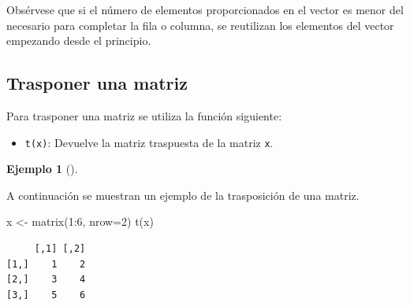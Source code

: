 \documentclass[
  spanish,
  a4paper,
]{scrreport}
\newenvironment{Shaded}{\begin{snugshade}}{\end{snugshade}}
\newcommand{\AttributeTok}[1]{\textcolor[rgb]{0.40,0.45,0.13}{#1}}
\newcommand{\DecValTok}[1]{\textcolor[rgb]{0.68,0.00,0.00}{#1}}
\newcommand{\FunctionTok}[1]{\textcolor[rgb]{0.28,0.35,0.67}{#1}}
\newcommand{\NormalTok}[1]{\textcolor[rgb]{0.00,0.23,0.31}{#1}}
\newcommand{\OtherTok}[1]{\textcolor[rgb]{0.00,0.23,0.31}{#1}}
\newcommand{\SpecialCharTok}[1]{\textcolor[rgb]{0.37,0.37,0.37}{#1}}
\providecommand{\tightlist}{%
  \setlength{\itemsep}{0pt}\setlength{\parskip}{0pt}}
\theoremstyle{definition}
\theoremstyle{definition}
\newtheorem{example}{Ejemplo}[chapter]
\theoremstyle{remark}
\begin{document}
\begin{tcolorbox}[enhanced jigsaw, arc=.35mm, bottomrule=.15mm, bottomtitle=1mm, breakable, colback=white, colbacktitle=quarto-callout-warning-color!10!white, colframe=quarto-callout-warning-color-frame, coltitle=black, left=2mm, leftrule=.75mm, opacityback=0, opacitybacktitle=0.6, rightrule=.15mm, title=\textcolor{quarto-callout-warning-color}{\faExclamationTriangle}\hspace{0.5em}{Advertencia}, titlerule=0mm, toprule=.15mm, toptitle=1mm]

Obsérvese que si el número de elementos proporcionados en el vector es
menor del necesario para completar la fila o columna, se reutilizan los
elementos del vector empezando desde el principio.

\end{tcolorbox}

\subsection{Trasponer una matriz}\label{trasponer-una-matriz}

Para trasponer una matriz se utiliza la función siguiente:

\begin{itemize}
\tightlist
\item
  \texttt{t(x)}: Devuelve la matriz traspuesta de la matriz \texttt{x}.
\end{itemize}

\begin{example}[]\protect\hypertarget{exm-trasposicion-matriz}{}\label{exm-trasposicion-matriz}

A continuación se muestran un ejemplo de la trasposición de una matriz.

\begin{Shaded}
\begin{Highlighting}[]
\NormalTok{x }\OtherTok{\textless{}{-}} \FunctionTok{matrix}\NormalTok{(}\DecValTok{1}\SpecialCharTok{:}\DecValTok{6}\NormalTok{, }\AttributeTok{nrow=}\DecValTok{2}\NormalTok{)}
\FunctionTok{t}\NormalTok{(x)}
\end{Highlighting}
\end{Shaded}

\begin{verbatim}
     [,1] [,2]
[1,]    1    2
[2,]    3    4
[3,]    5    6
\end{verbatim}

\end{example}
\end{document}
